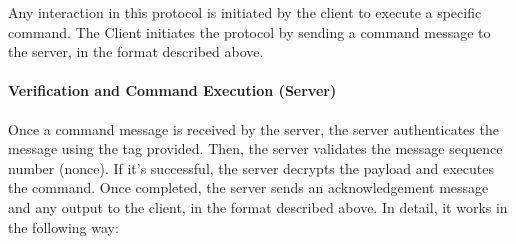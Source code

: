 \documentclass[12pt]{article}
\begin{document}
Any interaction in this protocol is initiated by the client to execute a specific command. The Client initiates the protocol by sending a command message to the server, in the format described above.

\paragraph{Verification and Command Execution (Server)}

Once a command message is received by the server, the server authenticates the message using the tag provided. Then, the server validates the message sequence number (nonce). If it’s successful, the server decrypts the payload and executes the command. Once completed, the server sends an acknowledgement message and any output to the client, in the format described above. In detail, it works in the following way:
\end{document}
